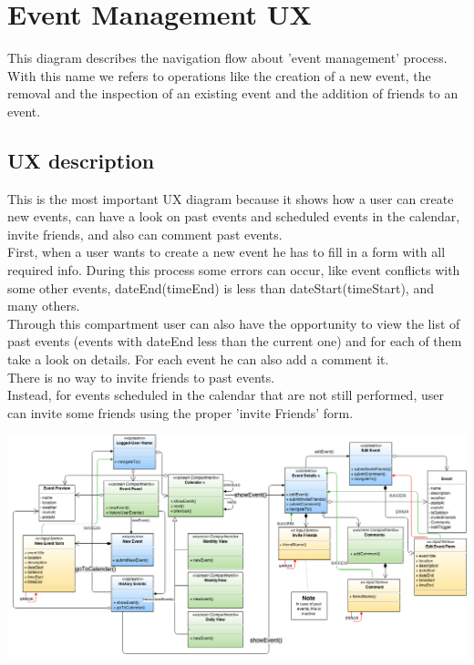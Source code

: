 \documentclass[12pt]{book}
\begin{document}
\section{Event Management UX}
This diagram describes the navigation flow about 'event management' process. With this name we refers to operations like the creation of a new event, the removal and the inspection of an existing event and the addition of friends to an event. 
\subsection{UX description}
This is the most important UX diagram because it shows how a user can create new events, can have a look on past events and scheduled events in the calendar, invite friends, and also can comment past events. \\
First, when a user wants to create a new event he has to fill in a form with all required info. During this process some errors can occur, like event conflicts with some other events, dateEnd(timeEnd) is less than dateStart(timeStart), and many others. \\ Through this compartment user can also have the opportunity to view the list of past events (events with dateEnd less than the current one) and for each of them take a look on details. For each event he can also add a comment it. \\
There is no way to invite friends to past events. \\
Instead, for events scheduled in the calendar that are not still performed, user can invite some friends using the proper 'invite Friends' form. \\ 
\newpage
\begin{landscape}
\begin{center}
\includegraphics[scale=0.5]{event_management_UX}\\
\end{center}
\end{landscape}
\end{document}
